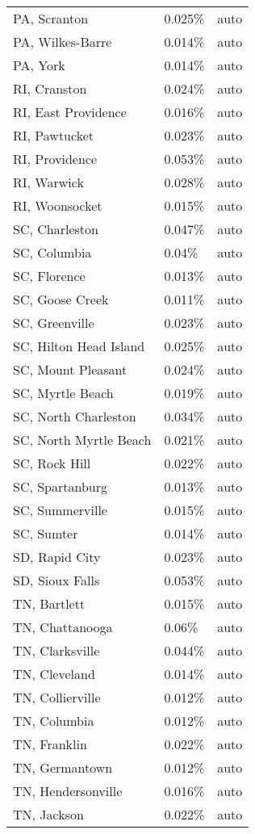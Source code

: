 \begin{longtable}[]{@{}lll@{}}
PA, Scranton & 0.025\% & auto \\
PA, Wilkes-Barre & 0.014\% & auto \\
PA, York & 0.014\% & auto \\
RI, Cranston & 0.024\% & auto \\
RI, East Providence & 0.016\% & auto \\
RI, Pawtucket & 0.023\% & auto \\
RI, Providence & 0.053\% & auto \\
RI, Warwick & 0.028\% & auto \\
RI, Woonsocket & 0.015\% & auto \\
SC, Charleston & 0.047\% & auto \\
SC, Columbia & 0.04\% & auto \\
SC, Florence & 0.013\% & auto \\
SC, Goose Creek & 0.011\% & auto \\
SC, Greenville & 0.023\% & auto \\
SC, Hilton Head Island & 0.025\% & auto \\
SC, Mount Pleasant & 0.024\% & auto \\
SC, Myrtle Beach & 0.019\% & auto \\
SC, North Charleston & 0.034\% & auto \\
SC, North Myrtle Beach & 0.021\% & auto \\
SC, Rock Hill & 0.022\% & auto \\
SC, Spartanburg & 0.013\% & auto \\
SC, Summerville & 0.015\% & auto \\
SC, Sumter & 0.014\% & auto \\
SD, Rapid City & 0.023\% & auto \\
SD, Sioux Falls & 0.053\% & auto \\
TN, Bartlett & 0.015\% & auto \\
TN, Chattanooga & 0.06\% & auto \\
TN, Clarksville & 0.044\% & auto \\
TN, Cleveland & 0.014\% & auto \\
TN, Collierville & 0.012\% & auto \\
TN, Columbia & 0.012\% & auto \\
TN, Franklin & 0.022\% & auto \\
TN, Germantown & 0.012\% & auto \\
TN, Hendersonville & 0.016\% & auto \\
TN, Jackson & 0.022\% & auto \\

\end{longtable}
